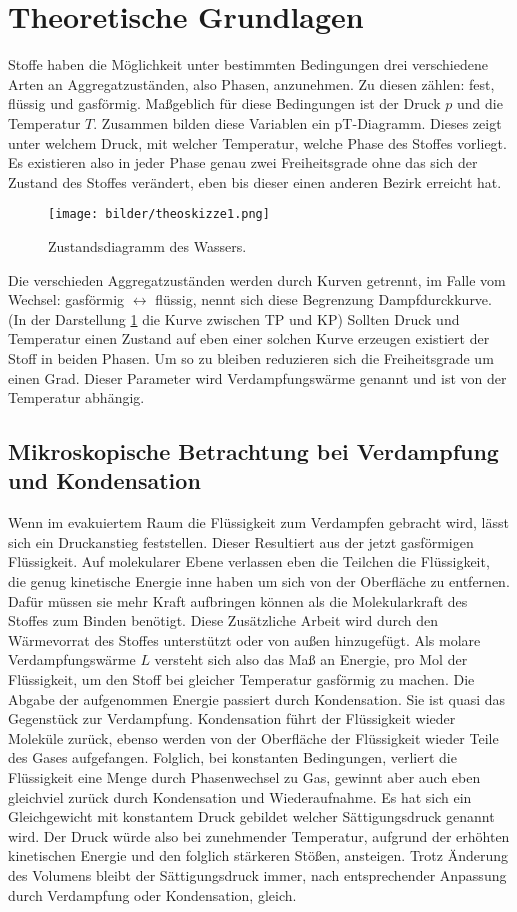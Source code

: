 \section{Theoretische Grundlagen}
Stoffe haben die Möglichkeit unter bestimmten Bedingungen drei verschiedene Arten an Aggregatzuständen, also Phasen, anzunehmen.
Zu diesen zählen: fest, flüssig und gasförmig.
Maßgeblich für diese Bedingungen ist der Druck $p$ und die Temperatur $T$.  Zusammen bilden diese Variablen
ein pT-Diagramm. Dieses zeigt unter welchem Druck, mit welcher Temperatur,  welche Phase des Stoffes vorliegt.
Es existieren also in jeder Phase genau zwei Freiheitsgrade ohne das sich der Zustand des Stoffes verändert, eben bis dieser einen anderen Bezirk erreicht hat.
\begin{figure}
    \centering
    \texttt{[image: bilder/theoskizze1.png]}
    \caption{Zustandsdiagramm des Wassers. \cite{skript}} 
    \label{fig:figtheo1}
\end{figure}
Die verschieden Aggregatzuständen werden durch Kurven getrennt, im Falle vom Wechsel: gasförmig $\longleftrightarrow$ flüssig,
nennt sich diese Begrenzung Dampfdurckkurve. (In der Darstellung \ref{fig:figtheo1}
die Kurve zwischen TP und KP)
Sollten Druck und Temperatur einen Zustand auf eben einer solchen Kurve erzeugen existiert der Stoff in beiden Phasen.
Um so zu bleiben reduzieren sich die Freiheitsgrade um einen Grad. Dieser Parameter wird Verdampfungswärme genannt und ist von der Temperatur
abhängig. 

\subsection{Mikroskopische Betrachtung bei Verdampfung und Kondensation}
Wenn im evakuiertem Raum die Flüssigkeit zum Verdampfen gebracht wird, lässt sich ein Druckanstieg feststellen.
Dieser Resultiert aus der jetzt gasförmigen Flüssigkeit. Auf molekularer Ebene verlassen eben die Teilchen die Flüssigkeit, die genug kinetische Energie 
inne haben um sich von der Oberfläche zu entfernen. Dafür müssen sie mehr Kraft aufbringen können als die Molekularkraft des Stoffes zum Binden benötigt.
Diese Zusätzliche Arbeit wird durch den Wärmevorrat des Stoffes unterstützt oder von außen hinzugefügt.
Als molare Verdampfungswärme $L$ versteht sich also das Maß an Energie, pro Mol der Flüssigkeit, um den Stoff bei gleicher Temperatur gasförmig zu machen.
Die Abgabe der aufgenommen Energie passiert durch Kondensation. Sie ist quasi das Gegenstück zur Verdampfung.
Kondensation führt der Flüssigkeit wieder Moleküle zurück, ebenso werden von der Oberfläche der Flüssigkeit wieder Teile des Gases aufgefangen.
Folglich, bei konstanten Bedingungen, verliert die Flüssigkeit eine Menge durch Phasenwechsel zu Gas, gewinnt aber auch eben gleichviel 
zurück durch Kondensation und Wiederaufnahme. Es hat sich ein Gleichgewicht mit konstantem Druck gebildet welcher Sättigungsdruck genannt wird.
Der Druck würde also bei zunehmender Temperatur, aufgrund der erhöhten kinetischen Energie und den folglich stärkeren Stößen, ansteigen.
Trotz Änderung des Volumens bleibt der Sättigungsdruck immer, nach entsprechender Anpassung durch Verdampfung oder Kondensation, gleich.

